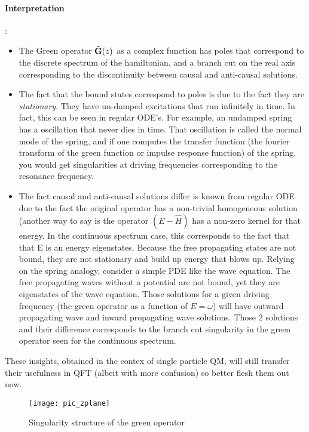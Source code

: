 \documentclass[11pt]{article}
\theoremstyle{definition}
\begin{document}
\paragraph{Interpretation}:
\begin{itemize}
\item The Green operator $\mathbf{\tilde{G}}(z)$ as a complex function has poles that correspond to the discrete spectrum of the hamiltonian, and a branch cut on the real axis corresponding to the discontinuity between causal and anti-causal solutions.  
\item The fact that the bound states correspond to poles is due to the fact they are \emph{stationary}.  They have un-damped excitations that run infinitely in time.  In fact, this can be seen in regular ODE's.  For example, an undamped spring has a oscillation that never dies in time.  That oscillation is called the normal mode of the spring, and if one computes the transfer function (the fourier transform of the green function or impulse response function) of the spring, you would get singularities at driving frequencies corresponding to the resonance frequency.
\item The fact causal and anti-causal solutions differ is known from regular ODE due to the fact the original operator has a non-trivial homogeneous solution (another way to say is the operator $(E - \hat{H})$ has a non-zero kernel for that energy.  In the continuous spectrum case, this corresponds to the fact that that E is an energy eigenstates.  Because the free propagating states are not bound, they are not stationary and build up energy that blows up.  Relying on the spring analogy, consider a simple PDE like the wave equation.  The free propagating waves without a potential are not bound, yet they are eigenstates of the wave equation.  Those solutions for a given driving frequency (the green operator as a function of $E = \omega$) will have outward propagating wave and inward propagating wave solutions.  Those 2 solutions and their difference corresponds to the branch cut singularity in the green operator seen for the continuous spectrum.
\end{itemize}

These insights, obtained in the contex of single particle QM, will still transfer their usefulness in QFT (albeit with more confusion) so better flesh them out now.
\begin{figure}
  \texttt{[image: pic\_zplane]}
  \caption{Singularity structure of the green operator}
  \label{fig:boat1}
\end{figure}
\end{document}
